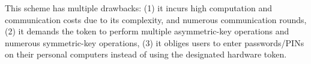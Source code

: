 



This scheme has multiple drawbacks: (1) it incurs high computation and communication costs due to its complexity, and numerous communication rounds, (2) it demands the token to perform multiple asymmetric-key operations and numerous symmetric-key operations, (3) it obliges users to enter passwords/PINs on their personal computers instead of using the designated hardware token. %


%



